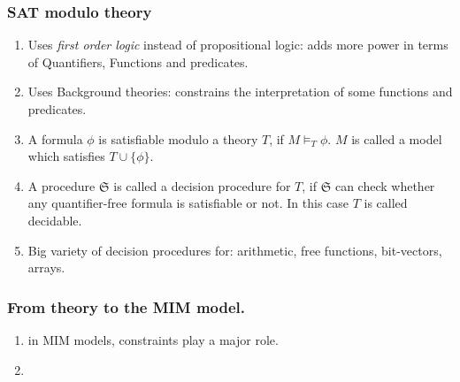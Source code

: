 \documentclass[swedish]{beamer}
\begin{document}
 \begin{frame}
  \frametitle{SAT modulo theory}
  \begin{enumerate}
   \item Uses \emph{first order logic} instead of propositional logic: adds more power in terms of Quantifiers, Functions and predicates.
   \item Uses Background theories: constrains the interpretation of some functions and predicates.
   \item A formula $\phi$ is satisfiable modulo a theory $T$, if $M \models_{T} \phi$. $M$ is called a model which satisfies $T \cup \{\phi\}$.
   \item A procedure $\mathfrak{S}$ is called a decision procedure for $T$, if $\mathfrak{S}$ can check whether any quantifier-free formula is satisfiable or not. In this case $T$ is called decidable.
   
   \item Big variety of decision procedures for: arithmetic, free functions, bit-vectors, arrays.
  \end{enumerate}
 \end{frame}
 
 \begin{frame}
  \frametitle{From theory to the MIM model.}
  \begin{enumerate}
   \item in MIM models, constraints play a major role. 
   
   \item 
  \end{enumerate}
 \end{frame}
\end{document}
